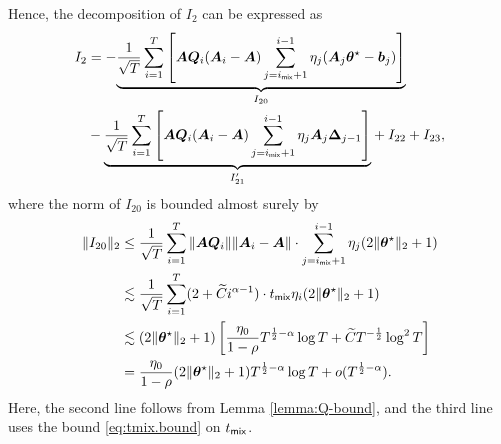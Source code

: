 \color{black}

Hence, the decomposition of $I_2$ can be expressed as
\begin{align}\label{eq:markov-Berry-Esseen-I2-decompose}
I_2 &= -\underset{I_{20}}{\underbrace{\frac{1}{\sqrt{T}}\sum_{i=1}^T \left[\bm{AQ}_i (\bm{A}_i - \bm{A})\sum_{j=i_{\mathsf{mix}}+1}^{i-1} \eta_j (\bm{A}_j \bm{\theta}^\star - \bm{b}_j)\right]}} \nonumber \\ 
&- \underset{I_{21}'}{\underbrace{\frac{1}{\sqrt{T}}\sum_{i=1}^T \left[\bm{AQ}_i (\bm{A}_i - \bm{A})\sum_{j=i_{\mathsf{mix}}+1}^{i-1} \eta_j \bm{A}_j \bm{\Delta}_{j-1}\right]}} + I_{22} + I_{23},
\end{align}
where the norm of $I_{20}$ is bounded almost surely by
\begin{align}\label{eq:markov-Berry-Esseen-I20}
\|I_{20}\|_2&\leq \frac{1}{\sqrt{T}}\sum_{i=1}^T \|\bm{AQ}_i\| \|\bm{A}_i - \bm{A}\| \cdot \sum_{j=i_{\mathsf{mix}}+1}^{i-1} \eta_j (2\|\bm{\theta}^\star\|_2 + 1)\nonumber \\ 
&\lesssim \frac{1}{\sqrt{T}}\sum_{i=1}^T (2+\widetilde{C}i^{\alpha-1})\cdot t_{\mathsf{mix}} \eta_i (2\|\bm{\theta}^\star\|_2 + 1)\nonumber \\ 
&\lesssim (2\|\bm{\theta}^\star\|_2 + 1) \left[\frac{\eta_0 }{1-\rho}T^{\frac{1}{2}-\alpha}\log T + \widetilde{C}T^{-\frac{1}{2}}\log^2 T\right]\nonumber \\
&= \frac{\eta_0 }{1-\rho}(2\|\bm{\theta}^\star\|_2 + 1) T^{\frac{1}{2}-\alpha}\log T + o(T^{\frac{1}{2}-\alpha}).
\end{align}
Here, the second line follows from Lemma \ref{lemma:Q-bound}, and the third line uses the bound \eqref{eq:tmix.bound} on $t_{\mathsf{mix}}$.


